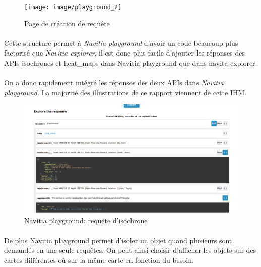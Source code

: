 \documentclass[a4paper]{report}
\begin{document}
\begin{figure}[H]
	\begin{center}
		\texttt{[image: image/playground\_2]}
		\caption{Page de création de requête}
		\label{Page de création de requête}
	\end{center}
\end{figure}

\paragraph{} Cette structure permet à \emph{Navitia playground} d'avoir un code beaucoup plus factorisé que \emph{Navitia explorer}, il est donc plus facile d'ajouter les réponses des APIs isochrones et heat\_maps dans Navitia playground que dans navita explorer. 

\paragraph{} On a donc rapidement intégré les réponses des deux APIs dans \emph{Navitia playground}. La majorité des illustrations de ce rapport viennent de cette IHM.  

\begin{figure}[H]
	\begin{center}
		\includegraphics[width=400pt]{image/n_p_flux_json}
		\caption{Navitia playground: requête d'isochrone}
		\label{Navitia playground: requête d'isochrone}
	\end{center}
\end{figure}

\paragraph{} De plus Navitia playground permet d'isoler un objet quand plusieurs sont demandés en une seule requêtes. On peut ainsi choisir d'afficher les objets sur des cartes différentes où sur la même carte en fonction du besoin.
\end{document}
